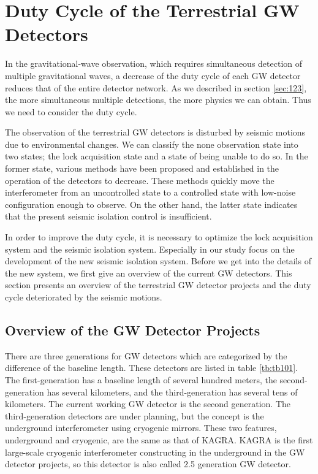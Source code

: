 \section{Duty Cycle of the Terrestrial GW Detectors} \label{sec:14}
In the gravitational-wave observation, which requires simultaneous detection of multiple gravitational waves, a decrease of the duty cycle of each GW detector reduces that of the entire detector network. As we described in section \cref{sec:123}, the more simultaneous multiple detections, the more physics we can obtain. Thus we need to consider the duty cycle.

The observation of the terrestrial GW detectors is disturbed by seismic motions due to environmental changes. We can classify the none observation state into two states; the lock acquisition state and a state of being unable to do so. In the former state, various methods have been proposed and established in the operation of the detectors to decrease. These methods quickly move the interferometer from an uncontrolled state to a controlled state with low-noise configuration enough to observe. On the other hand, the latter state indicates that the present seismic isolation control is insufficient.

In order to improve the duty cycle, it is necessary to optimize the lock acquisition system and the seismic isolation system. Especially in our study focus on the development of the new seismic isolation system. Before we get into the details of the new system, we first give an overview of the current GW detectors. This section presents an overview of the terrestrial GW detector projects and the duty cycle deteriorated by the seismic motions.


\subsection{Overview of the GW Detector Projects}
There are three generations for GW detectors which are categorized by the difference of the baseline length. These detectors are listed in table \ref{tb:tb101}. The first-generation has a baseline length of several hundred meters, the second-generation has several kilometers, and the third-generation has several tens of kilometers. The current working GW detector is the second generation. The third-generation detectors are under planning, but the concept is the underground interferometer using cryogenic mirrors. These two features, underground and cryogenic, are the same as that of KAGRA. KAGRA is the first large-scale cryogenic interferometer constructing in the underground in the GW detector projects, so this detector is also called 2.5 generation GW detector.

